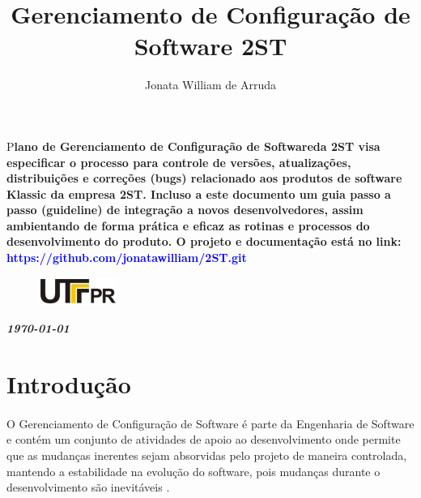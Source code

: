\documentclass[	DIV=calc,%
							paper=a4,%
							fontsize=12pt,%
							onecolumn]{scrartcl}	 					%
\title{Gerenciamento de Configuração de Software 2ST }					%
\author{Jonata William de Arruda}  	%
\date{}																				%
\newcommand{\initial}[1]{%
     \lettrine[lines=3,lhang=0.3,nindent=0em]{
     				\color{DarkGoldenrod}
     				{\textsf{#1}}}{}}
\begin{document}
\maketitle
\thispagestyle{fancy} 	
\thispagestyle{empty}		%




\initial{P}\textbf{lano de Gerenciamento de Configuração de Softwareda 2ST visa especificar o processo para controle de versões, atualizações, distribuições e correções (bugs) relacionado aos produtos de software Klassic da empresa 2ST. Incluso a este documento um guia passo a passo (guideline) de integração a novos desenvolvedores, assim ambientando de forma prática e eficaz as rotinas e processos do desenvolvimento do produto. O projeto e documentação está no link: \textcolor{blue}{https://github.com/jonatawilliam/2ST.git}}

\begin{figure}
	\centering
	\includegraphics{utfpr}
\end{figure}

\vspace{3cm}
\centerline{\textit{\textbf{\today}}}

\clearpage
    \renewcommand*\listfigurename{Lista de figuras}
\listoffigures

\renewcommand*\listtablename{Lista de tabelas}
\listoftables




\clearpage
\renewcommand{\contentsname}{Sumário}
\tableofcontents
\clearpage

\section{Introdução}
\paragraph{}
O Gerenciamento de Configuração de Software é parte da Engenharia de Software e contém um conjunto de atividades de apoio ao desenvolvimento onde permite que as mudanças inerentes sejam absorvidas pelo projeto de maneira controlada, mantendo a estabilidade na evolução do software, pois mudanças durante o desenvolvimento são inevitáveis \cite{pressman1995engenharia}.
\end{document}

